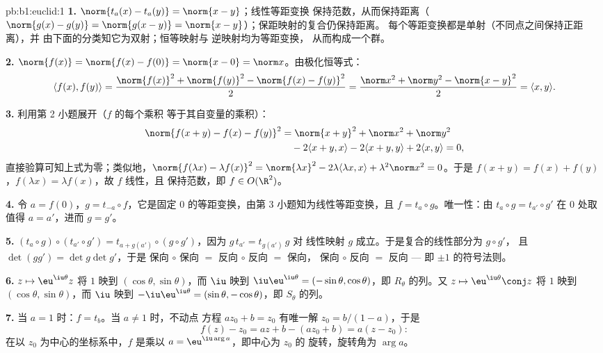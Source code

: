 \begin{solution}{pb:b1:euclid:1}
\textbf{1.} $\norm{t_a(x) - t_a(y)} = \norm{x - y}$；线性等距变换
保持范数，从而保持距离（$\norm{g(x) - g(y)} =
\norm{g(x - y)} = \norm{x-y}$）；保距映射的复合仍保持距离。
每个等距变换都是单射（不同点之间保持正距离），并
由下面的分类知它为双射；恒等映射与
逆映射均为等距变换，
从而构成一个群。

\textbf{2.} $\norm{f(x)} = \norm{f(x) - f(0)} = \norm{x - 0} =
\norm x$。由极化恒等式：
\[
\langle f(x), f(y)\rangle
= \frac{\norm{f(x)}^2 + \norm{f(y)}^2 - \norm{f(x) -
f(y)}^2}{2}
= \frac{\norm x^2 + \norm y^2 - \norm{x - y}^2}{2}
= \langle x, y\rangle .
\]

\textbf{3.} 利用第 2 小题展开（$f$ 的每个乘积
等于其自变量的乘积）：
\begin{align*}
\norm{f(x+y) - f(x) - f(y)}^2
&= \norm{x+y}^2 + \norm x^2 + \norm y^2\\
&\quad - 2\langle x+y, x\rangle - 2\langle x+y, y\rangle
+ 2\langle x, y\rangle = 0 ,
\end{align*}
直接验算可知上式为零；类似地，$\norm{f(\lambda x) -
\lambda f(x)}^2 = \norm{\lambda x}^2 - 2\lambda\langle \lambda
x, x\rangle + \lambda^2\norm x^2 = 0$。于是 $f(x + y) = f(x) +
f(y)$，$f(\lambda x) = \lambda f(x)$，故 $f$ 线性，且
保持范数，即 $f \in O(\R^2)$。

\textbf{4.} 令 $a = f(0)$，$g = t_{-a}\circ f$，它是固定
$0$ 的等距变换，由第 3 小题知为线性等距变换，且 $f = t_a
\circ g$。唯一性：由 $t_a \circ g = t_{a'}\circ g'$ 在
$0$ 处取值得 $a = a'$，进而 $g = g'$。

\textbf{5.} $(t_a\circ g)\circ(t_{a'}\circ g') = t_{a +
g(a')}\circ(g\circ g')$，因为 $g\,t_{a'} = t_{g(a')}\,g$ 对
线性映射 $g$ 成立。于是复合的线性部分为 $g \circ g'$，
且 $\det(gg') = \det g \det g'$，于是
保向 $\circ$ 保向 $=$ 反向 $\circ$ 反向 $=$ 保向，
保向 $\circ$ 反向 $=$ 反向 --- 即 $\pm1$ 的符号法则。

\textbf{6.} $z \mapsto \eu^{\iu\theta}z$ 将 $1$ 映到
$(\cos\theta, \sin\theta)$，而 $\iu$ 映到
$\iu\eu^{\iu\theta} = (-\sin\theta, \cos\theta)$，即
$R_\theta$ 的列。又 $z \mapsto \eu^{\iu\theta}\conj z$ 将 $1$ 映到
$(\cos\theta, \sin\theta)$，而 $\iu$ 映到 $-\iu\eu^{\iu\theta} =
(\sin\theta, -\cos\theta)$，即 $S_\theta$ 的列。

\textbf{7.} 当 $a = 1$ 时：$f = t_b$。当 $a \neq 1$ 时，不动点
方程 $az_0 + b = z_0$ 有唯一解 $z_0 = b/(1 -
a)$，于是
\[
f(z) - z_0 = az + b - (az_0 + b) = a(z - z_0):
\]
在以 $z_0$ 为中心的坐标系中，$f$ 是乘以 $a
= \eu^{\iu\arg a}$，即中心为 $z_0$ 的
旋转，旋转角为 $\arg a$。


\end{solution}
